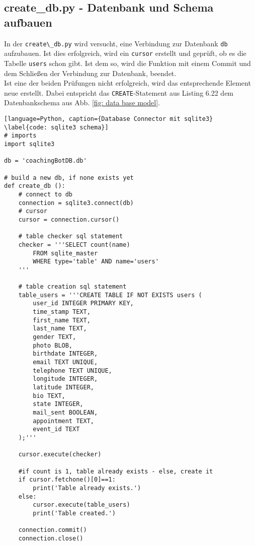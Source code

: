         \subsection{create\_db.py - Datenbank und Schema aufbauen}
            In der \verb|create\_db.py| wird versucht, eine Verbindung zur Datenbank \verb|db| aufzubauen. Ist dies erfolgreich, wird ein \verb|cursor| erstellt und geprüft, ob es die Tabelle \verb|users| schon gibt. Ist dem so, wird die Funktion mit einem Commit und dem Schließen der Verbindung zur Datenbank, beendet. \\
            Ist eine der beiden Prüfungen nicht erfolgreich, wird das entsprechende Element neue erstellt. Dabei entspricht das \verb|CREATE|-Statement aus Listing 6.22 dem Datenbankschema aus Abb. \ref*{fig: data base model}.
            \begin{lstlisting}[language=Python, caption={Database Connector mit sqlite3} \label{code: sqlite3 schema}]
# imports
import sqlite3

db = 'coachingBotDB.db'

# build a new db, if none exists yet
def create_db ():
    # connect to db
    connection = sqlite3.connect(db)
    # cursor
    cursor = connection.cursor()

    # table checker sql statement
    checker = '''SELECT count(name)
        FROM sqlite_master
        WHERE type='table' AND name='users'
    '''

    # table creation sql statement
    table_users = '''CREATE TABLE IF NOT EXISTS users (
        user_id INTEGER PRIMARY KEY,
        time_stamp TEXT,
        first_name TEXT,
        last_name TEXT,
        gender TEXT,
        photo BLOB,
        birthdate INTEGER,
        email TEXT UNIQUE,
        telephone TEXT UNIQUE,
        longitude INTEGER,
        latitude INTEGER,
        bio TEXT,
        state INTEGER,
        mail_sent BOOLEAN,
        appointment TEXT,
        event_id TEXT
    );'''

    cursor.execute(checker)

    #if count is 1, table already exists - else, create it
    if cursor.fetchone()[0]==1:
        print('Table already exists.')
    else:
        cursor.execute(table_users)
        print('Table created.')

    connection.commit()
    connection.close()
                \end{lstlisting}


